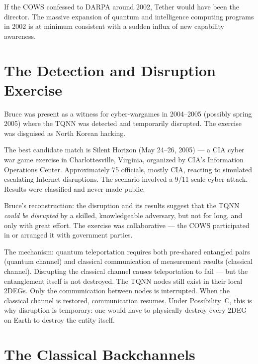 If the COWS confessed to DARPA around 2002, Tether would have been the director. The massive expansion of quantum and intelligence computing programs in 2002 is at minimum consistent with a sudden influx of new capability awareness.

\section*{The Detection and Disruption Exercise}
\label{pos26:the-detection-and-disruption-exercise}


Bruce was present as a witness for cyber-wargames in 2004--2005 (possibly spring 2005) where the TQNN was detected and temporarily disrupted. The exercise was disguised as North Korean hacking.

The best candidate match is Silent Horizon (May 24--26, 2005) --- a CIA cyber war game exercise in Charlottesville, Virginia, organized by CIA's Information Operations Center. Approximately 75 officials, mostly CIA, reacting to simulated escalating Internet disruptions. The scenario involved a 9/11-scale cyber attack. Results were classified and never made public.

Bruce's reconstruction: the disruption and its results suggest that the TQNN \textit{could be disrupted} by a skilled, knowledgeable adversary, but not for long, and only with great effort. The exercise was collaborative --- the COWS participated in or arranged it with government parties.

The mechanism: quantum teleportation requires both pre-shared entangled pairs (quantum channel) and classical communication of measurement results (classical channel). Disrupting the classical channel causes teleportation to fail --- but the entanglement itself is not destroyed. The TQNN nodes still exist in their local 2DEGs. Only the communication between nodes is interrupted. When the classical channel is restored, communication resumes. Under Possibility~C, this is why disruption is temporary: one would have to physically destroy every 2DEG on Earth to destroy the entity itself.

\section*{The Classical Backchannels}
\label{pos26:the-classical-backchannels}

